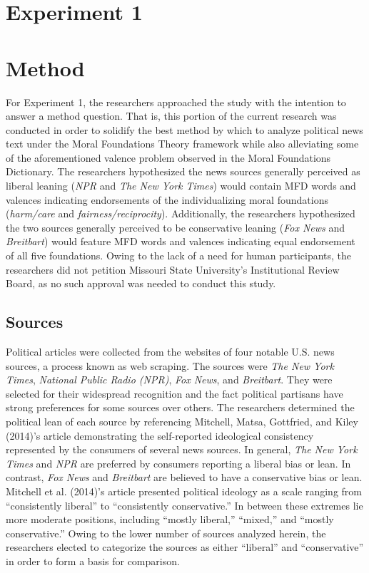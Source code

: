 \documentclass[english,,man]{apa6}
\begin{document}
\hypertarget{experiment-1}{%
\section{Experiment 1}\label{experiment-1}}

\hypertarget{method}{%
\section{Method}\label{method}}

For Experiment 1, the researchers approached the study with the intention to answer a method question. That is, this portion of the current research was conducted in order to solidify the best method by which to analyze political news text under the Moral Foundations Theory framework while also alleviating some of the aforementioned valence problem observed in the Moral Foundations Dictionary. The researchers hypothesized the news sources generally perceived as liberal leaning (\emph{NPR} and \emph{The New York Times}) would contain MFD words and valences indicating endorsements of the individualizing moral foundations (\emph{harm/care} and \emph{fairness/reciprocity}). Additionally, the researchers hypothesized the two sources generally perceived to be conservative leaning (\emph{Fox News} and \emph{Breitbart}) would feature MFD words and valences indicating equal endorsement of all five foundations. Owing to the lack of a need for human participants, the researchers did not petition Missouri State University's Institutional Review Board, as no such approval was needed to conduct this study.

\hypertarget{sources}{%
\subsection{Sources}\label{sources}}

Political articles were collected from the websites of four notable U.S. news sources, a process known as web scraping. The sources were \emph{The New York Times}, \emph{National Public Radio (NPR)}, \emph{Fox News}, and \emph{Breitbart}. They were selected for their widespread recognition and the fact political partisans have strong preferences for some sources over others. The researchers determined the political lean of each source by referencing Mitchell, Matsa, Gottfried, and Kiley (2014)'s article demonstrating the self-reported ideological consistency represented by the consumers of several news sources. In general, \emph{The New York Times} and \emph{NPR} are preferred by consumers reporting a liberal bias or lean. In contrast, \emph{Fox News} and \emph{Breitbart} are believed to have a conservative bias or lean. Mitchell et al. (2014)'s article presented political ideology as a scale ranging from \enquote{consistently liberal} to \enquote{consistently conservative.} In between these extremes lie more moderate positions, including \enquote{mostly liberal,} \enquote{mixed,} and \enquote{mostly conservative.} Owing to the lower number of sources analyzed herein, the researchers elected to categorize the sources as either \enquote{liberal} and \enquote{conservative} in order to form a basis for comparison.
\end{document}
